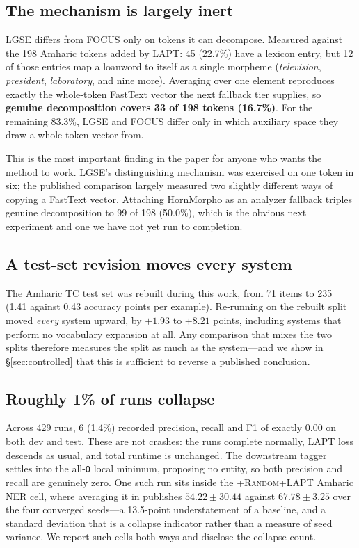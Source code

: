 \documentclass[11pt]{article}
\begin{document}
\subsection{The mechanism is largely inert}
\label{sec:coverage}

LGSE differs from FOCUS only on tokens it can decompose. Measured against
the 198 Amharic tokens added by LAPT: 45 (22.7\%) have a lexicon entry, but
12 of those entries map a loanword to itself as a single morpheme
(\textit{television}, \textit{president}, \textit{laboratory}, and nine
more). Averaging over one element reproduces exactly the whole-token FastText
vector the next fallback tier supplies, so \textbf{genuine decomposition
covers 33 of 198 tokens (16.7\%)}. For the remaining 83.3\%, LGSE and FOCUS
differ only in which auxiliary space they draw a whole-token vector from.

This is the most important finding in the paper for anyone who wants the
method to work. LGSE's distinguishing mechanism was exercised on one token in
six; the published comparison largely measured two slightly different ways of
copying a FastText vector. Attaching HornMorpho \citep{gasser-2011-hornmorpho}
as an analyzer fallback triples genuine decomposition to 99 of 198 (50.0\%),
which is the obvious next experiment and one we have not yet run to
completion.

\subsection{A test-set revision moves every system}
\label{sec:confound}

The Amharic TC test set was rebuilt during this work, from 71 items to 235
(1.41 against 0.43 accuracy points per example). Re-running on the rebuilt
split moved \textit{every} system upward, by $+1.93$ to $+8.21$ points,
including systems that perform no vocabulary expansion at all. Any comparison
that mixes the two splits therefore measures the split as much as the
system---and we show in \S\ref{sec:controlled} that this is sufficient to
reverse a published conclusion.

\subsection{Roughly 1\% of runs collapse}
\label{sec:degenerate}

Across 429 runs, 6 (1.4\%) recorded precision, recall and F1 of exactly 0.00
on both dev and test. These are not crashes: the runs complete normally, LAPT loss
descends as usual, and total runtime is unchanged. The downstream tagger
settles into the all-\texttt{O} local minimum, proposing no entity, so both
precision and recall are genuinely zero. One such run sits inside the
\textsc{+Random+LAPT} Amharic NER cell, where averaging it in publishes
$54.22 \pm 30.44$ against $67.78 \pm 3.25$ over the four converged
seeds---a 13.5-point understatement of a baseline, and a standard deviation
that is a collapse indicator rather than a measure of seed variance. We
report such cells both ways and disclose the collapse count.
\end{document}
